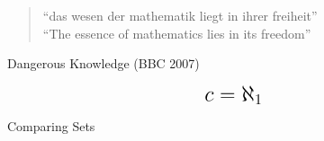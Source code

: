 \begin{frame}{}

  \pause
  \begin{quote}
    \begin{center}
    ``das wesen der mathematik liegt in ihrer freiheit'' \\[8pt]
    \pause
    ``The essence of mathematics lies in its freedom''
    \end{center}
  \end{quote}
\end{frame}

\begin{frame}{}
  \centerline{\Large Dangerous Knowledge (BBC 2007)}

  \vspace{0.50cm}

  \[
    \text{\LARGE $c = \aleph_{1}$}
  \]
\end{frame}

\begin{frame}{}

  \centerline{\LARGE Comparing Sets}

  \pause
  \vspace{-0.30cm}
  \begin{columns}
  \end{columns}

  \pause
  \centerline{\Large {}}
\end{frame}
